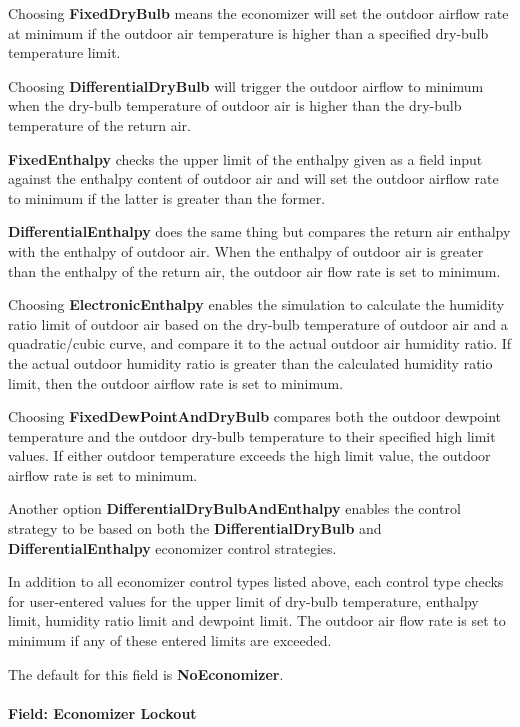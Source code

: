 Choosing \textbf{FixedDryBulb} means the economizer will set the outdoor airflow rate at minimum if the outdoor air temperature is higher than a specified dry-bulb temperature limit.

Choosing \textbf{DifferentialDryBulb} will trigger the outdoor airflow to minimum when the dry-bulb temperature of outdoor air is higher than the dry-bulb temperature of the return air.

\textbf{FixedEnthalpy} checks the upper limit of the enthalpy given as a field input against the enthalpy content of outdoor air and will set the outdoor airflow rate to minimum if the latter is greater than the former.

\textbf{DifferentialEnthalpy} does the same thing but compares the return air enthalpy with the enthalpy of outdoor air. When the enthalpy of outdoor air is greater than the enthalpy of the return air, the outdoor air flow rate is set to minimum.

Choosing \textbf{ElectronicEnthalpy} enables the simulation to calculate the humidity ratio limit of outdoor air based on the dry-bulb temperature of outdoor air and a quadratic/cubic curve, and compare it to the actual outdoor air humidity ratio. If the actual outdoor humidity ratio is greater than the calculated humidity ratio limit, then the outdoor airflow rate is set to minimum.

Choosing \textbf{FixedDewPointAndDryBulb} compares both the outdoor dewpoint temperature and the outdoor dry-bulb temperature to their specified high limit values. If either outdoor temperature exceeds the high limit value, the outdoor airflow rate is set to minimum.

Another option \textbf{DifferentialDryBulbAndEnthalpy} enables the control strategy to be based on both the \textbf{DifferentialDryBulb} and \textbf{DifferentialEnthalpy} economizer control strategies.

In addition to all economizer control types listed above, each control type checks for user-entered values for the upper limit of dry-bulb temperature, enthalpy limit, humidity ratio limit and dewpoint limit. The outdoor air flow rate is set to minimum if any of these entered limits are exceeded.

The default for this field is \textbf{NoEconomizer}.

\paragraph{Field: Economizer Lockout}\label{field-economizer-lockout-5}

